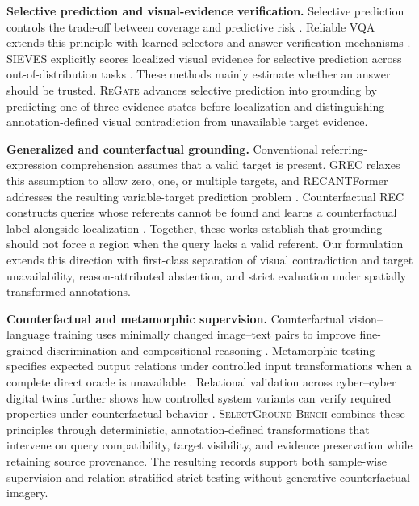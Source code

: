 \documentclass[letterpaper]{article}
\newcommand{\Bench}{\textsc{SelectGround-Bench}\xspace}
\newcommand{\Method}{\textsc{ReGate}\xspace}
\begin{document}
\textbf{Selective prediction and visual-evidence verification.}
Selective prediction controls the trade-off between coverage and predictive risk \citep{geifman2017selective,geifman2019selectivenet}. Reliable VQA extends this principle with learned selectors and answer-verification mechanisms \citep{whitehead2022reliable,dancette2023selective,khan2024consistency,srinivasan2024recoverr}. SIEVES explicitly scores localized visual evidence for selective prediction across out-of-distribution tasks \citep{rodriguez2026sieves}. These methods mainly estimate whether an answer should be trusted. \Method advances selective prediction into grounding by predicting one of three evidence states before localization and distinguishing annotation-defined visual contradiction from unavailable target evidence.

\textbf{Generalized and counterfactual grounding.}
Conventional referring-expression comprehension assumes that a valid target is present. GREC relaxes this assumption to allow zero, one, or multiple targets, and RECANTFormer addresses the resulting variable-target prediction problem \citep{he2023grec,hemanthage2024recantformer}. Counterfactual REC constructs queries whose referents cannot be found and learns a counterfactual label alongside localization \citep{yu2024counterfactualrec}. Together, these works establish that grounding should not force a region when the query lacks a valid referent. Our formulation extends this direction with first-class separation of visual contradiction and target unavailability, reason-attributed abstention, and strict evaluation under spatially transformed annotations.

\textbf{Counterfactual and metamorphic supervision.}
Counterfactual vision--language training uses minimally changed image--text pairs to improve fine-grained discrimination and compositional reasoning \citep{zhang2025cfvlm,wu2025antidote}. Metamorphic testing specifies expected output relations under controlled input transformations when a complete direct oracle is unavailable \citep{chen1998metamorphic,segura2016survey}. Relational validation across cyber--cyber digital twins further shows how controlled system variants can verify required properties under counterfactual behavior \citep{ahlgren2021facebook}. \Bench combines these principles through deterministic, annotation-defined transformations that intervene on query compatibility, target visibility, and evidence preservation while retaining source provenance. The resulting records support both sample-wise supervision and relation-stratified strict testing without generative counterfactual imagery.
\end{document}
